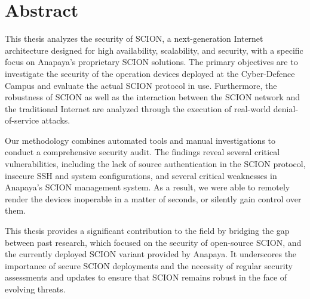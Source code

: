 \chapter*{Abstract}





This thesis analyzes the security of SCION, a next-generation Internet architecture designed for high availability, scalability, and security, with a specific focus on Anapaya's proprietary SCION solutions.
The primary objectives are to investigate the security of the operation devices deployed at the Cyber-Defence Campus and evaluate the actual SCION protocol in use.
Furthermore, the robustness of SCION as well as the interaction between the SCION network and the traditional Internet are analyzed through the execution of real-world denial-of-service attacks.

Our methodology combines automated tools and manual investigations to conduct a comprehensive security audit.
The findings reveal several critical vulnerabilities, including the lack of source authentication in the SCION protocol, insecure SSH and system configurations, and several critical weaknesses in Anapaya's SCION management system.
As a result, we were able to remotely render the devices inoperable in a matter of seconds, or silently gain control over them.

This thesis provides a significant contribution to the field by bridging the gap between past research, which focused on the security of open-source SCION, and the currently deployed SCION variant provided by Anapaya.
It underscores the importance of secure SCION deployments and the necessity of regular security assessments and updates to ensure that SCION remains robust in the face of evolving threats.